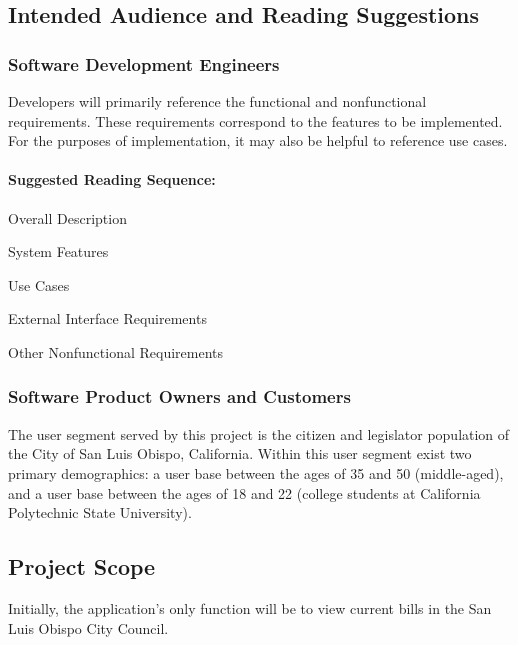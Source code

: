 \documentclass[12pt,oneside,letterpaper]{article}
\newcounter{use_case}
\newcounter{functional_requirement}
\begin{document}
\subsection{Intended Audience and Reading Suggestions}

\subsubsection{Software Development Engineers}
Developers will primarily reference the functional and nonfunctional
requirements. These requirements correspond to the features to be
implemented. For the purposes of implementation, it may also be
helpful to reference use cases.

\paragraph{Suggested Reading Sequence:}
\begin{compactenum}
\item Overall Description
\item System Features
\item Use Cases
\item External Interface Requirements
\item Other Nonfunctional Requirements
\end{compactenum}

\subsubsection{Software Product Owners and Customers}
The user segment served by this project is the citizen and legislator
population of the City of San Luis Obispo, California.
Within this user segment exist two primary demographics: a user base
between the ages of 35 and 50 (middle-aged), and a user base between
the ages of 18 and 22 (college students at California Polytechnic
State University).

\subsection{Project Scope}
Initially, the application's only function will be to view current
bills in the San Luis Obispo City Council.
\end{document}
